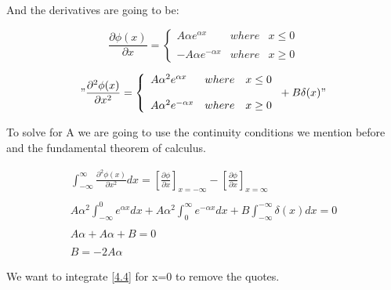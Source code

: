 And the derivatives are going to be:

\begin{equation}
    \label{4.8}
        \frac{\partial\phi(x)}{\partial x}= \left\{ \begin{array}{lcc} A\alpha e^{\alpha x} & where & x \leq 0 \\
        \\ -A\alpha e^{-\alpha x} & where & x \geq 0 \end{array} \right.
\end{equation}

\begin{equation}
    \label{4.9}
        "\frac{\partial^2\phi(x)}{\partial x^2}= \left\{ \begin{array}{lcc} A\alpha^2 e^{\alpha x} & where & x \leq 0 \\
        \\ A\alpha^2 e^{-\alpha x} & where & x \geq 0 \end{array} \right. +B\delta(x)"
\end{equation}

To solve for A we are going to use the continuity conditions we mention before and the fundamental theorem of calculus.

\begin{equation}
    \label{4.10}
        \begin{array}{c}
            \int_{-\infty}^{\infty} \frac{\partial^2\phi(x)}{\partial x^2} dx = \left[ \frac{\partial \phi}{\partial x}\right]_{x=-\infty} - \left[ \frac{\partial \phi}{\partial x}\right]_{x=\infty}
            \\

            \\
            A\alpha^2\int_{-\infty}^{0}e^{\alpha x}dx+ A \alpha^2\int_{0}^{\infty}e^{-\alpha x}dx+B\int_{-\infty}^{-\infty}\delta(x) dx = 0
            \\

            \\
            A\alpha+A\alpha +B = 0
            \\

            \\
            B = -2A\alpha
        \end{array}
\end{equation}

We want to integrate \ref{4.4} for x=0 to remove the quotes.

